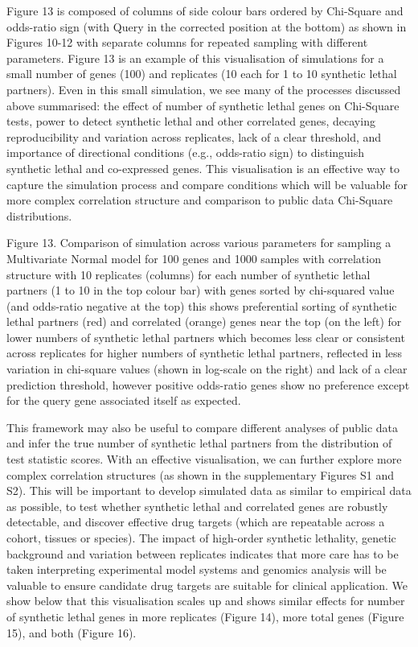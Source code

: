 Figure 13 is composed of columns of side colour bars ordered by Chi-Square and odds-ratio sign (with Query in the corrected position at the bottom) as shown in Figures 10-12 with separate columns for repeated sampling with different parameters.  Figure 13 is an example of this visualisation of simulations for a small number of genes (100) and replicates (10 each for 1 to 10 synthetic lethal partners).  Even in this small simulation, we see many of the processes discussed above summarised: the effect of number of synthetic lethal genes on Chi-Square tests, power to detect synthetic lethal and other correlated genes, decaying reproducibility and variation across replicates, lack of a clear threshold, and importance of directional conditions (e.g., odds-ratio sign) to distinguish synthetic lethal and co-expressed genes.  This visualisation is an effective way to capture the simulation process and compare conditions which will be valuable for more complex correlation structure and comparison to public data Chi-Square distributions.
    
Figure 13.  Comparison of simulation across various parameters for sampling a Multivariate Normal model for 100 genes and 1000 samples with correlation structure with 10 replicates (columns) for each number of synthetic lethal partners (1 to 10 in the top colour bar) with genes sorted by chi-squared value (and odds-ratio negative at the top) this shows preferential sorting of synthetic lethal partners (red) and correlated (orange) genes near the top (on the left) for lower numbers of synthetic lethal partners which becomes less clear or consistent across replicates for higher numbers of synthetic lethal partners, reflected in less variation in chi-square values (shown in log-scale on the right) and lack of a clear prediction threshold, however positive odds-ratio genes show no preference except for the query gene associated itself as expected.

This framework may also be useful to compare different analyses of public data and infer the true number of synthetic lethal partners from the distribution of test statistic scores.  With an effective visualisation, we can further explore more complex correlation structures (as shown in the supplementary Figures S1 and S2).  This will be important to develop simulated data as similar to empirical data as possible, to test whether synthetic lethal and correlated genes are robustly detectable, and discover effective drug targets (which are repeatable across a cohort, tissues or species).  The impact of high-order synthetic lethality, genetic background and variation between replicates indicates that more care has to be taken interpreting experimental model systems and genomics analysis will be valuable to ensure candidate drug targets are suitable for clinical application.  We show below that this visualisation scales up and shows similar effects for number of synthetic lethal genes in more replicates (Figure 14), more total genes (Figure 15), and both (Figure 16).
    
